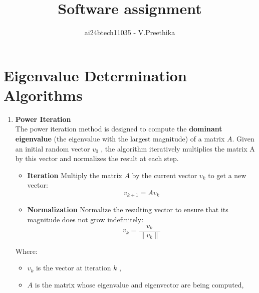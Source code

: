 \documentclass[journal]{IEEEtran}
\begin{document}

\vspace{3cm}

\title{Software assignment}
\author{ai24btech11035 - V.Preethika}
\maketitle
\bigskip

\renewcommand{\thefigure}{\theenumi}
\renewcommand{\thetable}{\theenumi}
\section{Eigenvalue Determination Algorithms}
\begin{enumerate}
\item \textbf{Power Iteration}\\
The power iteration method is designed to compute the \textbf{dominant eigenvalue} (the eigenvalue with the largest magnitude) of a matrix $A$. Given an initial random vector $v_0$ , the algorithm iteratively multiplies the matrix A by this vector and normalizes the result at each step.\\
\begin{itemize}
	\item \textbf{Iteration} Multiply the matrix $A$ by the current vector $v_k$ to get a new vector:   \[ v_{k+1} = A v_k \]
	\item \textbf{Normalization}  Normalize the resulting vector to ensure that its magnitude does not grow indefinitely:
		\[ v_k=\frac{v_k}{\|v_k\|} \]
\end{itemize}
Where:
\begin{itemize}
\item $v_k$ is the vector at iteration $k$ ,

\item $A$ is the matrix whose eigenvalue and eigenvector are being computed,


\end{itemize}
\end{enumerate}
\end{document}

